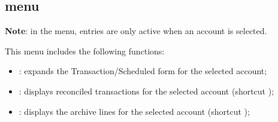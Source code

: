\subsection{ menu\label{home-menus-display}}

\textbf{Note}: in the  menu, entries are only active when an account is selected.

This menu includes the following functions: 

\vspace{3mm}
\noindent
\begin{minipage}{.7\linewidth}
	\begin{itemize}[rightmargin=.6cm]
		\item {}: expands the Transaction/Scheduled form for the selected account;
		\item {}: displays reconciled transactions for the selected account (shortcut );
		\item {}: displays the archive lines for the selected account (shortcut );
	\end{itemize}
\end{minipage}
\hspace{10pt}	
